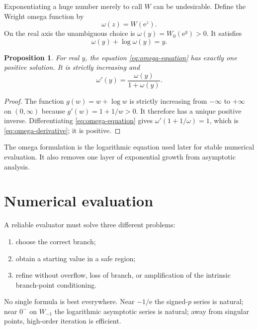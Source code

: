 \documentclass[11pt]{article}
\numberwithin{equation}{section}
\newtheorem{proposition}[theorem]{Proposition}
\theoremstyle{definition}
\theoremstyle{remark}
\newcommand{\e}{\mathrm e}
\begin{document}
Exponentiating a huge number merely to call $W$ can be undesirable.  Define
the Wright omega function by
\begin{equation}
  \omega(z)=W(\e^z).                                  \label{eq:omega-definition}
\end{equation}
On the real axis the unambiguous choice is
$\omega(y)=W_0(\e^y)>0$.  It satisfies
\begin{equation}
  \omega(y)+\log\omega(y)=y.                          \label{eq:omega-equation}
\end{equation}

\begin{proposition}
For real $y$, the equation \eqref{eq:omega-equation} has exactly one positive
solution.  It is strictly increasing and
\begin{equation}
  \omega'(y)=\frac{\omega(y)}{1+\omega(y)}.            \label{eq:omega-derivative}
\end{equation}
\end{proposition}

\begin{proof}
The function $g(w)=w+\log w$ is strictly increasing from $-\infty$ to
$+\infty$ on $(0,\infty)$ because $g'(w)=1+1/w>0$.  It therefore has a unique
positive inverse.  Differentiating \eqref{eq:omega-equation} gives
$\omega'(1+1/\omega)=1$, which is \eqref{eq:omega-derivative}; it is positive.
\end{proof}

The omega formulation is the logarithmic equation used later for stable
numerical evaluation.  It also removes one layer of exponential growth from
asymptotic analysis.

\section{Numerical evaluation}
\label{sec:numerics}

A reliable evaluator must solve three different problems:
\begin{enumerate}
\item choose the correct branch;
\item obtain a starting value in a safe region;
\item refine without overflow, loss of branch, or amplification of the
      intrinsic branch-point conditioning.
\end{enumerate}
No single formula is best everywhere.  Near $-1/\e$ the signed-$p$ series is
natural; near $0^-$ on $W_{-1}$ the logarithmic asymptotic series is natural;
away from singular points, high-order iteration is efficient.
\end{document}
